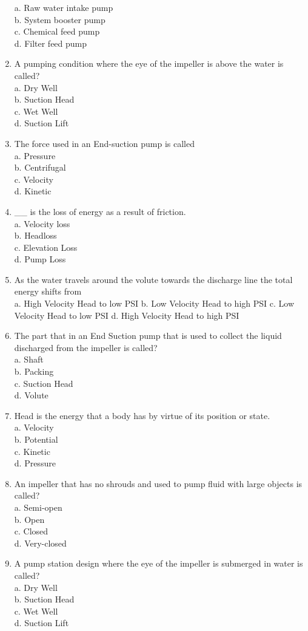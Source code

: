 \begin{enumerate}[1.]
a. Raw water intake pump\\
b. System booster pump\\
c. Chemical feed pump\\
d. Filter feed pump\\
\item A pumping condition where the eye of the impeller is above the water is called?\\
a. Dry Well\\
b. Suction Head\\
c. Wet Well\\
d. Suction Lift\\
\item The force used in an End-suction pump is called\\
a. Pressure\\
b. Centrifugal\\
c. Velocity\\
d. Kinetic\\
\item \_\_ is the loss of energy as a result of friction.\\
a. Velocity loss\\
b. Headloss\\
c. Elevation Loss\\
d. Pump Loss\\
\item As the water travels around the volute towards the discharge line the total energy shifts from\\
a. High Velocity Head to low PSI b. Low Velocity Head to high PSI c. Low Velocity Head to low PSI d. High Velocity Head to high PSI\\
\item The part that in an End Suction pump that is used to collect the liquid discharged from the impeller is called?\\
a. Shaft\\
b. Packing\\
c. Suction Head\\
d. Volute\\
\item Head is the energy that a body has by virtue of its position or state.\\
a. Velocity\\
b. Potential\\
c. Kinetic\\
d. Pressure\\
\item An impeller that has no shrouds and used to pump fluid with large objects is called?\\
a. Semi-open\\
b. Open\\
c. Closed\\
d. Very-closed\\
\item A pump station design where the eye of the impeller is submerged in water is called?\\
a. Dry Well\\
b. Suction Head\\
c. Wet Well\\
d. Suction Lift\\

\end{enumerate}


